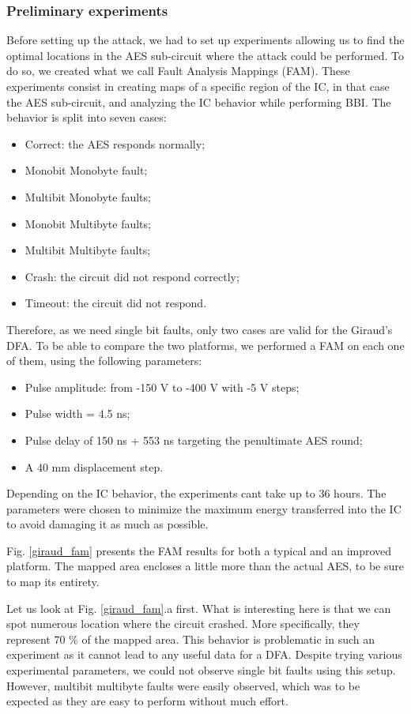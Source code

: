 		\subsubsection{Preliminary experiments}
			Before setting up the attack, we had to set up experiments allowing us to find the optimal locations in the AES sub-circuit where the attack could be performed.
			To do so, we created what we call Fault Analysis Mappings (FAM).
			These experiments consist in creating maps of a specific region of the IC, in that case the AES sub-circuit, and analyzing the IC behavior while performing BBI.
			The behavior is split into seven cases:
			\begin{itemize}
				\item Correct: the AES responds normally;
				\item Monobit Monobyte fault;
				\item Multibit Monobyte faults;
				\item Monobit Multibyte faults;
				\item Multibit Multibyte faults;
				\item Crash: the circuit did not respond correctly;
				\item Timeout: the circuit did not respond.
			\end{itemize}
			Therefore, as we need single bit faults, only two cases are valid for the Giraud's DFA.
			To be able to compare the two platforms, we performed a FAM on each one of them, using the following parameters:
			\begin{itemize}
				\item Pulse amplitude: from -150 V to -400 V with -5 V steps;
				\item Pulse width = 4.5 ns;
				\item Pulse delay of 150 ns + 553 ns targeting the penultimate AES round;
				\item A 40 mm displacement step.
			\end{itemize}
			Depending on the IC behavior, the experiments cant take up to 36 hours.
			The parameters were chosen to minimize the maximum energy transferred into the IC to avoid damaging it as much as possible.
			
			Fig. \ref{giraud_fam} presents the FAM results for both a typical and an improved platform.
			The mapped area encloses a little more than the actual AES, to be sure to map its entirety.

			Let us look at Fig. \ref{giraud_fam}.a first.
			What is interesting here is that we can spot numerous location where the circuit crashed.
			More specifically, they represent 70 \% of the mapped area.
			This behavior is problematic in such an experiment as it cannot lead to any useful data for a DFA.
			Despite trying various experimental parameters, we could not observe single bit faults using this setup.
			However, multibit multibyte faults were easily observed, which was to be expected as they are easy to perform without much effort.

